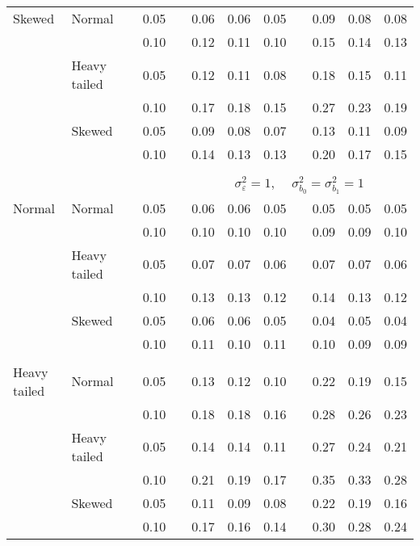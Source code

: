 \begin{table}[ht]
\begin{scriptsize}
\begin{center}
\begin{tabular}{ll p{.1cm} c p{.1cm} rrr p{.1cm} rrr}
Skewed       & Normal       && 0.05 &&  0.06 & 0.06 & 0.05 && 0.09 & 0.08 & 0.08 \\ 
             &              && 0.10 &&  0.12 & 0.11 & 0.10 && 0.15 & 0.14 & 0.13 \\ 
             & Heavy tailed && 0.05 &&  0.12 & 0.11 & 0.08 && 0.18 & 0.15 & 0.11 \\ 
             &              && 0.10 &&  0.17 & 0.18 & 0.15 && 0.27 & 0.23 & 0.19 \\ 
             & Skewed       && 0.05 &&  0.09 & 0.08 & 0.07 && 0.13 & 0.11 & 0.09 \\ 
             &              && 0.10 &&  0.14 & 0.13 & 0.13 && 0.20 & 0.17 & 0.15 \\ 

&&&&&&&&&&&\\
& && && \multicolumn{7}{c}{$\sigma_{\varepsilon}^2 = 1$, \ \ $\sigma_{b_0}^2 = \sigma_{b_1}^2 = 1$} \\ \cline{6-12}
\rowcolor{gray!20}Normal       & Normal       && 0.05 &&  0.06 & 0.06 & 0.05 && 0.05 & 0.05 & 0.05 \\ 
\rowcolor{gray!20}             &              && 0.10 &&  0.10 & 0.10 & 0.10 && 0.09 & 0.09 & 0.10 \\ 
\rowcolor{gray!20}             & Heavy tailed && 0.05 &&  0.07 & 0.07 & 0.06 && 0.07 & 0.07 & 0.06 \\ 
\rowcolor{gray!20}             &              && 0.10 &&  0.13 & 0.13 & 0.12 && 0.14 & 0.13 & 0.12 \\ 
\rowcolor{gray!20}             & Skewed       && 0.05 &&  0.06 & 0.06 & 0.05 && 0.04 & 0.05 & 0.04 \\ 
\rowcolor{gray!20}             &              && 0.10 &&  0.11 & 0.10 & 0.11 && 0.10 & 0.09 & 0.09 \\ 
             &&&&&&&&&&&\\
Heavy tailed & Normal       && 0.05 &&  0.13 & 0.12 & 0.10 && 0.22 & 0.19 & 0.15 \\ 
             &              && 0.10 &&  0.18 & 0.18 & 0.16 && 0.28 & 0.26 & 0.23 \\ 
             & Heavy tailed && 0.05 &&  0.14 & 0.14 & 0.11 && 0.27 & 0.24 & 0.21 \\ 
             &              && 0.10 &&  0.21 & 0.19 & 0.17 && 0.35 & 0.33 & 0.28 \\ 
             & Skewed       && 0.05 &&  0.11 & 0.09 & 0.08 && 0.22 & 0.19 & 0.16 \\ 
             &              && 0.10 &&  0.17 & 0.16 & 0.14 && 0.30 & 0.28 & 0.24 \\ 

\end{tabular}
\end{center}
\end{scriptsize}
\end{table}
